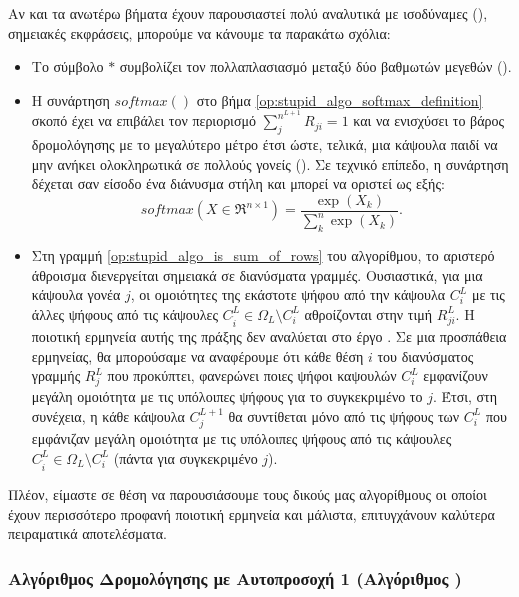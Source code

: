 Αν και τα ανωτέρω βήματα έχουν παρουσιαστεί πολύ αναλυτικά με ισοδύναμες (), σημειακές εκφράσεις, μπορούμε να κάνουμε τα παρακάτω σχόλια:
\begin{itemize}
  \item Το σύμβολο $\ast$ συμβολίζει τον πολλαπλασιασμό μεταξύ δύο βαθμωτών μεγεθών ().
  \item Η συνάρτηση $softmax()$ στο βήμα \ref{op:stupid_algo_softmax_definition} σκοπό έχει να επιβάλει τον περιορισμό $\sum_j^{n^{L+1}} R_{ji} = 1$ και να ενισχύσει το βάρος δρομολόγησης με το μεγαλύτερο μέτρο έτσι ώστε, τελικά, μια κάψουλα παιδί να μην ανήκει ολοκληρωτικά σε πολλούς γονείς (). Σε τεχνικό επίπεδο, η συνάρτηση δέχεται σαν είσοδο ένα διάνυσμα στήλη και μπορεί να οριστεί ως εξής:
  \begin{equation}
    \mathit{softmax}(X \in \Re^{n \times 1}) = \frac{\exp(X_k)}{\sum_k^n \exp(X_k)}.
  \end{equation}
  \item Στη γραμμή \ref{op:stupid_algo_is_sum_of_rows} του αλγορίθμου, το αριστερό άθροισμα διενεργείται σημειακά σε διανύσματα γραμμές. Ουσιαστικά, για μια κάψουλα γονέα $j$, οι ομοιότητες της εκάστοτε ψήφου από την κάψουλα $C_i^L$ με τις άλλες ψήφους από τις κάψουλες $C_{\acute{i}}^L \in \Omega_L \setminus C_i^L$ αθροίζονται στην τιμή $R_{ji}^L$. Η ποιοτική ερμηνεία αυτής της πράξης δεν αναλύεται στο έργο \cite{mazzia2021efficient}. Σε μια προσπάθεια ερμηνείας, θα μπορούσαμε να αναφέρουμε ότι κάθε θέση $i$ του διανύσματος γραμμής $R_j^L$ που προκύπτει, φανερώνει ποιες ψήφοι καψουλών $C_i^L$ εμφανίζουν μεγάλη ομοιότητα με τις υπόλοιπες ψήφους για το συγκεκριμένο το $j$. Έτσι, στη συνέχεια, η κάθε κάψουλα $C_j^{L+1}$ θα συντίθεται μόνο από τις ψήφους των $C_{i}^L$ που εμφάνιζαν μεγάλη ομοιότητα με τις υπόλοιπες ψήφους από τις κάψουλες $C_{\acute{i}}^L \in \Omega_L \setminus C_i^L$ (πάντα για συγκεκριμένο $j$).
\end{itemize}

Πλέον, είμαστε σε θέση να παρουσιάσουμε τους δικούς μας αλγορίθμους οι οποίοι έχουν περισσότερο προφανή ποιοτική ερμηνεία και μάλιστα, επιτυγχάνουν καλύτερα πειραματικά αποτελέσματα.

\subsubsection{Αλγόριθμος Δρομολόγησης με Αυτο\textendash προσοχή 1 (Αλγόριθμος )}

